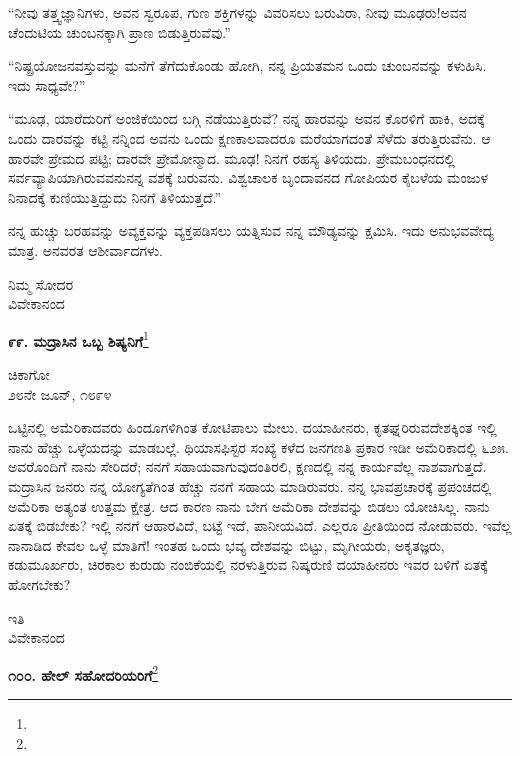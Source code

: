 “ನೀವು ತತ್ತ್ವಜ್ಞಾನಿಗಳು, ಅವನ ಸ್ವರೂಪ, ಗುಣ ಶಕ್ತಿಗಳನ್ನು ವಿವರಿಸಲು ಬರುವಿರಾ, ನೀವು ಮೂಢರು!ಅವನ ಚೆಂದುಟಿಯ ಚುಂಬನಕ್ಕಾಗಿ ಪ್ರಾಣ ಬಿಡುತ್ತಿರುವೆವು.”

“ನಿಷ್ಪ್ರಯೋಜನವಸ್ತುವನ್ನು ಮನೆಗೆ ತೆಗೆದುಕೊಂಡು ಹೋಗಿ, ನನ್ನ ಪ್ರಿಯತಮನ ಒಂದು ಚುಂಬನವನ್ನು ಕಳುಹಿಸಿ. ಇದು ಸಾಧ್ಯವೇ?”

“ಮೂಢ, ಯಾರೆದುರಿಗೆ ಅಂಜಿಕೆಯಿಂದ ಬಗ್ಗಿ ನಡೆಯುತ್ತಿರುವೆ? ನನ್ನ ಹಾರವನ್ನು ಅವನ ಕೊರಳಿಗೆ ಹಾಕಿ, ಅದಕ್ಕೆ ಒಂದು ದಾರವನ್ನು ಕಟ್ಟಿ ನನ್ನಿಂದ ಅವನು ಒಂದು ಕ್ಷಣಕಾಲವಾದರೂ ಮರೆಯಾಗದಂತೆ ಸೆಳೆದು ತರುತ್ತಿರುವೆನು. ಆ ಹಾರವೇ ಪ್ರೇಮದ ಪಟ್ಟಿ; ದಾರವೇ ಪ್ರೇಮೋನ್ಮಾದ. ಮೂಢ! ನಿನಗೆ ರಹಸ್ಯ ತಿಳಿಯದು. ಪ್ರೇಮಬಂಧನದಲ್ಲಿ ಸರ್ವವ್ಯಾಪಿಯಾಗಿರುವವನುನನ್ನ ವಶಕ್ಕೆ ಬರುವನು. ವಿಶ್ವಚಾಲಕ ಬೃಂದಾವನದ ಗೋಪಿಯರ ಕೈಬಳೆಯ ಮಂಜುಳ ನಿನಾದಕ್ಕೆ ಕುಣಿಯುತ್ತಿದ್ದುದು ನಿನಗೆ ತಿಳಿಯುತ್ತದೆ.”

ನನ್ನ ಹುಚ್ಚು ಬರಹವನ್ನು ಅವ್ಯಕ್ತವನ್ನು ವ್ಯಕ್ತಪಡಿಸಲು ಯತ್ನಿಸುವ ನನ್ನ ಮೌಡ್ಯವನ್ನು ಕ್ಷಮಿಸಿ. ಇದು ಅನುಭವವೇದ್ಯ ಮಾತ್ರ. ಅನವರತ ಆಶೀರ್ವಾದಗಳು.

{\flushright
ನಿಮ್ಮ ಸೋದರ\\ವಿವೇಕಾನಂದ\par}

\begin{center}
\textbf{೯೯. ಮದ್ರಾಸಿನ ಒಬ್ಬ ಶಿಷ್ಯನಿಗೆ}\footnote{}
\end{center}

\begin{flushright}
ಚಿಕಾಗೋ\\೨೮ನೇ ಜೂನ್, ೧೮೯೪
\end{flushright}

ಒಟ್ಟಿನಲ್ಲಿ ಅಮೆರಿಕಾದವರು ಹಿಂದೂಗಳಿಗಿಂತ ಕೋಟಿಪಾಲು ಮೇಲು. ದಯಾಹೀನರು, ಕೃತಘ್ನರಿರುವದೇಶಕ್ಕಿಂತ ಇಲ್ಲಿ ನಾನು ಹೆಚ್ಚು ಒಳ್ಳೆಯದನ್ನು ಮಾಡಬಲ್ಲೆ. ಥಿಯಾಸಫಿಸ್ಟರ ಸಂಖ್ಯೆ ಕಳೆದ ಜನಗಣತಿ ಪ್ರಕಾರ ಇಡೀ ಅಮೆರಿಕಾದಲ್ಲಿ ೬೨೫. ಅವರೊಂದಿಗೆ ನಾನು ಸೇರಿದರೆ; ನನಗೆ ಸಹಾಯವಾಗುವುದಂತಿರಲಿ, ಕ್ಷಣದಲ್ಲಿ ನನ್ನ ಕಾರ್ಯವೆಲ್ಲ ನಾಶವಾಗುತ್ತದೆ. ಮದ್ರಾಸಿನ ಜನರು ನನ್ನ ಯೋಗ್ಯತೆಗಿಂತ ಹೆಚ್ಚು ನನಗೆ ಸಹಾಯ ಮಾಡಿರುವರು. ನನ್ನ ಭಾವಪ್ರಚಾರಕ್ಕೆ ಪ್ರಪಂಚದಲ್ಲಿ ಅಮೆರಿಕಾ ಅತ್ಯಂತ ಉತ್ತಮ ಕ್ಷೇತ್ರ. ಆದ ಕಾರಣ ನಾನು ಬೇಗ ಅಮೆರಿಕಾ ದೇಶವನ್ನು ಬಿಡಲು ಯೋಚಿಸಿಲ್ಲ. ನಾನು ಏತಕ್ಕೆ ಬಿಡಬೇಕು? ಇಲ್ಲಿ ನನಗೆ ಆಹಾರವಿದೆ, ಬಟ್ಟೆ ಇದೆ, ಪಾನೀಯವಿದೆ. ಎಲ್ಲರೂ ಪ್ರೀತಿಯಿಂದ ನೋಡುವರು. ಇವೆಲ್ಲ ನಾನಾಡಿದ ಕೇವಲ ಒಳ್ಳೆ ಮಾತಿಗೆ! ಇಂತಹ ಒಂದು ಭವ್ಯ ದೇಶವನ್ನು ಬಿಟ್ಟು, ಮೃಗೀಯರು, ಅಕೃತಜ್ಞರು, ಕಡುಮೂರ್ಖರು, ಚಿರಕಾಲ ಕುರುಡು ನಂಬಿಕೆಯಲ್ಲಿ ನರಳುತ್ತಿರುವ ನಿಷ್ಕರುಣಿ ದಯಾಹೀನರು \enginline{-} ಇವರ ಬಳಿಗೆ ಏತಕ್ಕೆ ಹೋಗಬೇಕು?

{\flushright
ಇತಿ\\ವಿವೇಕಾನಂದ\par}

\begin{center}
\textbf{೧೦೦. ಹೇಲ್‌ ಸಹೋದರಿಯರಿಗೆ}\footnote{}
\end{center}

